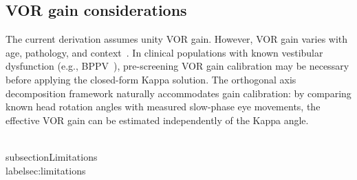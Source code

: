 \documentclass[review,numbers,sort&compress]{elsarticle}
\begin{document}
\subsection{VOR gain considerations}

The current derivation assumes unity VOR gain. However, VOR gain varies with age, pathology, and context~\cite{MacNeilage2010,Agrawal2019}. In clinical populations with known vestibular dysfunction (e.g., BPPV~\cite{Li2025}), pre-screening VOR gain calibration may be necessary before applying the closed-form Kappa solution. The orthogonal axis decomposition framework naturally accommodates gain calibration: by comparing known head rotation angles with measured slow-phase eye movements, the effective VOR gain can be estimated independently of the Kappa angle.

\\subsection{Limitations}
\\label{sec:limitations}
\end{document}
